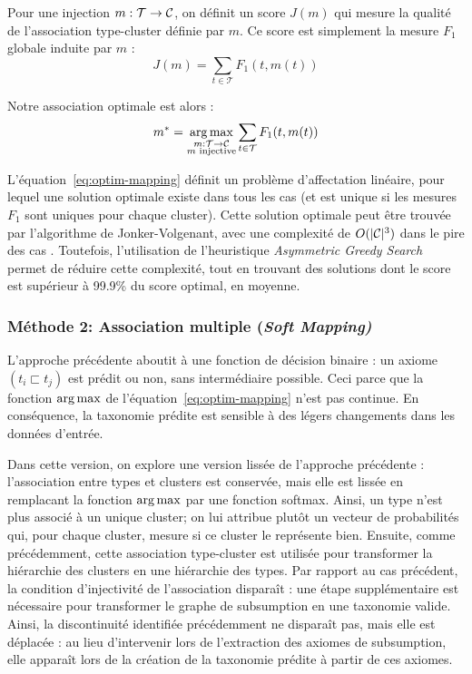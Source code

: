 Pour une injection $m : \mathcal{T} \rightarrow \mathcal{C}$, on définit un score $J(m)$ qui mesure la qualité de l'association type-cluster définie par $m$. Ce score est simplement la mesure $F_1$ globale induite par $m$ :
\begin{equation}
    J(m) = \sum_{t \in \mathcal{T}} F_1(t, m(t))
\end{equation}

Notre association optimale est alors :
\begin{equation}
    m^* = \operatorname*{arg\,max}_{
\substack{m : \mathcal{T} \rightarrow \mathcal{C} \\ m\text{ injective}}} \sum_{t \in \mathcal{T}} F_1(t, m(t))
\label{eq:optim-mapping}
\end{equation}


L'équation~\ref{eq:optim-mapping} définit un problème d'affectation linéaire, pour lequel une solution optimale existe dans tous les cas (et est unique si les mesures $F_1$ sont uniques pour chaque cluster).
Cette solution optimale peut être trouvée par l'algorithme de Jonker-Volgenant, avec une complexité de $O(|\mathcal{C}|^3)$ dans le pire des cas \cite{jonker1987shortest}. Toutefois, l'utilisation de l'heuristique \textit{Asymmetric Greedy Search} \cite{brown2017heuristic} permet de réduire cette complexité, tout en trouvant des solutions dont le score est supérieur à 99.9\% du score optimal, en moyenne.

\subsubsection{Méthode 2: Association multiple (\textit{Soft Mapping)}}
\label{ssubsec:te-softmapping}

L'approche précédente aboutit à une fonction de décision binaire : un axiome $(t_i \sqsubset t_j)$ est prédit ou non, sans intermédiaire possible. Ceci parce que la fonction $\operatorname*{arg\,max}$ de l'équation~\ref{eq:optim-mapping} n'est pas continue. En conséquence, la taxonomie prédite est sensible à des légers changements dans les données d'entrée.

Dans cette version, on explore une version lissée de l'approche précédente : l'association entre types et clusters est conservée, mais elle est lissée en remplacant la fonction $\operatorname*{arg\,max}$ par une fonction softmax. Ainsi, un type n'est plus associé à un unique cluster; on lui attribue plutôt un vecteur de probabilités qui, pour chaque cluster, mesure si ce cluster le représente  bien. Ensuite, comme précédemment, cette association type-cluster est utilisée pour transformer la hiérarchie des clusters en une hiérarchie des types. Par rapport au cas précédent, la condition d'injectivité de l'association disparaît : une étape supplémentaire est nécessaire pour transformer le graphe de subsumption en une taxonomie valide. Ainsi, la discontinuité identifiée précédemment ne disparaît pas, mais elle est déplacée : au lieu d'intervenir lors de l'extraction des axiomes de subsumption, elle apparaît lors de la création de la taxonomie prédite à partir de ces axiomes. 

